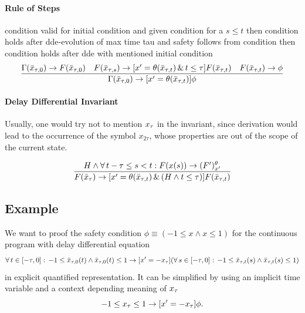 \documentclass[10pt]{article}
\begin{document}
\paragraph{Rule of Steps}\label{rule-of-steps}

condition valid for initial condition and given condition for a $s\leq t$ then condition holds after dde-evolution of max time tau and safety follows from condition then condition holds after dde with mentioned initial condition
\begin{equation}
\frac{\Gamma(\bar{x}_{\tau,0})\rightarrow F(\bar{x}_{\tau,0})\quad F(\bar{x}_{\tau,s})\rightarrow [x'=\theta(\bar{x}_{\tau,t})\,\&\,t\leq\tau]F(\bar{x}_{\tau,t}) \quad F(\bar{x}_{\tau,t})\rightarrow\phi}{\Gamma(\bar{x}_{\tau,0}) \rightarrow [x'=\theta(\bar{x}_{\tau,t})]\phi}
\end{equation}

\paragraph{Delay Differential Invariant}
\label{delay-differential-invariant}

Usually, one would try not to mention $x_{\tau}$ in the invariant, since derivation would lead to the occurrence of the symbol $x_{2\tau}$, whose properties are out of the scope of the current state.

\begin{equation}
    \frac{H\wedge\forall\,t-\tau\leq s<t: F(x(s))\rightarrow (F')^{\theta}_{x'}}{F(\bar{x}_{\tau})\rightarrow [x'=\theta(\bar{x}_{\tau,t})\,\&\,(H\wedge t\leq\tau)]F(\bar{x}_{\tau,t})}
\end{equation}

\subsection{Example}
\label{example-2}
We want to proof the safety condition $\phi\equiv(-1\leq x\wedge x\leq 1)$ for the continuous program with delay differential equation
\begin{equation}
    \forall\,t\in[-\tau,0]:\,-1\leq\bar{x}_{\tau,0}(t)\wedge\bar{x}_{\tau,0}(t)\leq 1
    \rightarrow
    [x'=-x_{\tau}] (\forall\,s\in[-\tau,0]:\,-1\leq\bar{x}_{\tau,t}(s)\wedge\bar{x}_{\tau,t}(s)\leq 1)
\end{equation}
in explicit quantified representation. It can be simplified by using an implicit time variable and a context depending meaning of $x_{\tau}$
\begin{equation}
    -1\leq x_{\tau}\leq 1 \rightarrow [x'=-x_{\tau}]\phi.
\end{equation}
\end{document}
